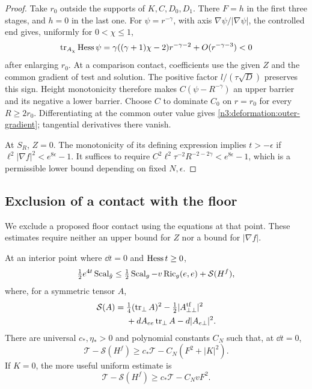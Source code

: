\begin{proof}
Take $r_0$ outside the supports of $K,C,D_0,D_1$.
There $F=h$ in the first three stages, and $h=0$ in the last one.
For $\psi=r^{-\gamma}$, with axis $\nabla\psi/|\nabla\psi|$,
the controlled end gives, uniformly for $0<\chi\le1$,
\[
 \operatorname{tr}_{A_\chi}\operatorname{Hess}\psi
 =\gamma((\gamma+1)\chi-2)r^{-\gamma-2}
      +O(r^{-\gamma-3})<0
\]
after enlarging $r_0$.
At a comparison contact, coefficients use the given $Z$ and the common
gradient of test and solution. The positive factor $l/(\tau\sqrt D)$
preserves this sign. Height monotonicity therefore makes
$C(\psi-R^{-\gamma})$ an upper barrier and its negative a lower barrier.
Choose $C$ to dominate $C_0$ on $r=r_0$ for every $R\ge2r_0$.
Differentiating at the common outer value gives
\eqref{n3:deformation:outer-gradient}; tangential derivatives there vanish.

At $S_R$, $Z=0$. The monotonicity of its defining expression implies
$t>-\epsilon$ if $\ell^2|\nabla f|^2<e^{8\epsilon}-1$.
It suffices to require
$C^2\ell^2\tau^{-2}R^{-2-2\gamma}<e^{8\epsilon}-1$,
which is a permissible lower bound depending on fixed $N,\epsilon$.
\end{proof}

\subsection{Exclusion of a contact with the floor}

We exclude a proposed floor contact using the equations at that point.
These estimates require neither an upper bound for $Z$ nor a bound for
$|\nabla f|$.

\begin{lemma}\label{n3:deformation:floor-curvature}
At an interior point where $\dd t=0$ and $\operatorname{Hess} t\ge0$,
\begin{equation}\label{n3:deformation:floor-gauss}
 \tfrac12e^{4t}\operatorname{Scal}_{\hat g}
 \le \tfrac12\operatorname{Scal}_g-v\operatorname{Ric}_g(e,e)+\mathcal S(H^f),
\end{equation}
where, for a symmetric tensor $A$,
\begin{equation}\label{n3:deformation:gauss-quadratic}
 \begin{split}
 \mathcal S(A)={}&\tfrac14(\operatorname{tr}_\perp A)^2
 -\tfrac12|A_{\perp\perp}^{\operatorname{tf}}|^2\\
 &+dA_{ee}\operatorname{tr}_\perp A-d|A_{e\perp}|^2.
 \end{split}
\end{equation}
There are universal $c_*,\eta_*>0$ and polynomial constants $C_N$ such
that, at $\dd t=0$,
\begin{equation}\label{n3:deformation:floor-algebra-general}
 \mathcal T-\mathcal S(H^f)
 \ge c_*\mathcal T-C_N(F^2+|K|^2).
\end{equation}
If $K=0$, the more useful uniform estimate is
\begin{equation}\label{n3:deformation:floor-algebra-end}
 \mathcal T-\mathcal S(H^f)\ge c_*\mathcal T-C_N vF^2.
\end{equation}
\end{lemma}

